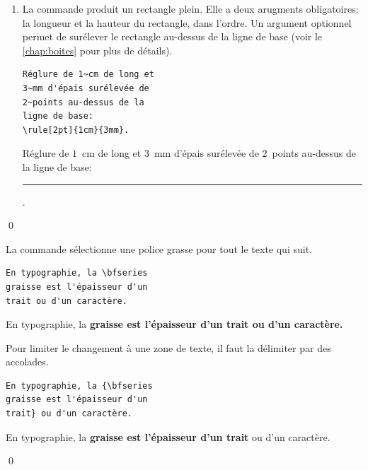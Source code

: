 \begin{exemple}
\begin{enumerate}
\begin{demo}
\begin{texample}
        connaître la syntaxe de
        {\LaTeX}.
      \end{texample}
    \end{demo}
  \item La commande \cmd{\rule} produit un rectangle plein. Elle a
    deux arugments obligatoires: la longueur et la hauteur du
    rectangle, dans l'ordre. Un argument optionnel permet de surélever
    le rectangle au-dessus de la ligne de base (voir le
    \autoref{chap:boites} pour plus de détails).
    \begin{demo}
      \begin{texample}
\begin{lstlisting}
Réglure de 1~cm de long et
3~mm d'épais surélevée de
2~points au-dessus de la
ligne de base:
\rule[2pt]{1cm}{3mm}.
\end{lstlisting}
        \producing
        Réglure de $1$~cm de long et
        $3$~mm d'épais surélevée de
        $2$~points au-dessus de la
        ligne de base: \rule[2pt]{1cm}{3mm}.
      \end{texample}
    \end{demo}
  \end{enumerate}
  \qed
\end{exemple}

\begin{exemple}
  La commande \cmd{\bfseries} sélectionne une police
  grasse pour tout le texte qui suit.
  \begin{demo}
    \begin{texample}
\begin{lstlisting}
En typographie, la \bfseries
graisse est l'épaisseur d'un
trait ou d'un caractère.
\end{lstlisting}
      \producing
      En typographie, la \bfseries
      graisse est l'épaisseur d'un
      trait ou d'un caractère.
    \end{texample}
  \end{demo}
  Pour limiter le changement à une zone de texte, il faut la délimiter
  par des accolades.
\begin{demo}
    \begin{texample}
\begin{lstlisting}
En typographie, la {\bfseries
graisse est l'épaisseur d'un
trait} ou d'un caractère.
\end{lstlisting}
      \producing
      En typographie, la {\bfseries
      graisse est l'épaisseur d’un
      trait} ou d’un caractère.
    \end{texample}
  \end{demo}
  \qed
\end{exemple}

